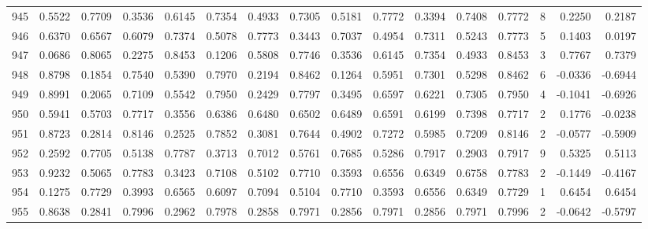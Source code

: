 \begin{tabular}{lrrrrrrrrrrrrrrr}
945 &      0.5522 &  0.7709 &  0.3536 &  0.6145 &  0.7354 &  0.4933 &  0.7305 &  0.5181 &  0.7772 &  0.3394 &   0.7408 &     0.7772 &      8 &                    0.2250 &                     0.2187 \\
946 &      0.6370 &  0.6567 &  0.6079 &  0.7374 &  0.5078 &  0.7773 &  0.3443 &  0.7037 &  0.4954 &  0.7311 &   0.5243 &     0.7773 &      5 &                    0.1403 &                     0.0197 \\
947 &      0.0686 &  0.8065 &  0.2275 &  0.8453 &  0.1206 &  0.5808 &  0.7746 &  0.3536 &  0.6145 &  0.7354 &   0.4933 &     0.8453 &      3 &                    0.7767 &                     0.7379 \\
948 &      0.8798 &  0.1854 &  0.7540 &  0.5390 &  0.7970 &  0.2194 &  0.8462 &  0.1264 &  0.5951 &  0.7301 &   0.5298 &     0.8462 &      6 &                   -0.0336 &                    -0.6944 \\
949 &      0.8991 &  0.2065 &  0.7109 &  0.5542 &  0.7950 &  0.2429 &  0.7797 &  0.3495 &  0.6597 &  0.6221 &   0.7305 &     0.7950 &      4 &                   -0.1041 &                    -0.6926 \\
950 &      0.5941 &  0.5703 &  0.7717 &  0.3556 &  0.6386 &  0.6480 &  0.6502 &  0.6489 &  0.6591 &  0.6199 &   0.7398 &     0.7717 &      2 &                    0.1776 &                    -0.0238 \\
951 &      0.8723 &  0.2814 &  0.8146 &  0.2525 &  0.7852 &  0.3081 &  0.7644 &  0.4902 &  0.7272 &  0.5985 &   0.7209 &     0.8146 &      2 &                   -0.0577 &                    -0.5909 \\
952 &      0.2592 &  0.7705 &  0.5138 &  0.7787 &  0.3713 &  0.7012 &  0.5761 &  0.7685 &  0.5286 &  0.7917 &   0.2903 &     0.7917 &      9 &                    0.5325 &                     0.5113 \\
953 &      0.9232 &  0.5065 &  0.7783 &  0.3423 &  0.7108 &  0.5102 &  0.7710 &  0.3593 &  0.6556 &  0.6349 &   0.6758 &     0.7783 &      2 &                   -0.1449 &                    -0.4167 \\
954 &      0.1275 &  0.7729 &  0.3993 &  0.6565 &  0.6097 &  0.7094 &  0.5104 &  0.7710 &  0.3593 &  0.6556 &   0.6349 &     0.7729 &      1 &                    0.6454 &                     0.6454 \\
955 &      0.8638 &  0.2841 &  0.7996 &  0.2962 &  0.7978 &  0.2858 &  0.7971 &  0.2856 &  0.7971 &  0.2856 &   0.7971 &     0.7996 &      2 &                   -0.0642 &                    -0.5797 \\

\end{tabular}
